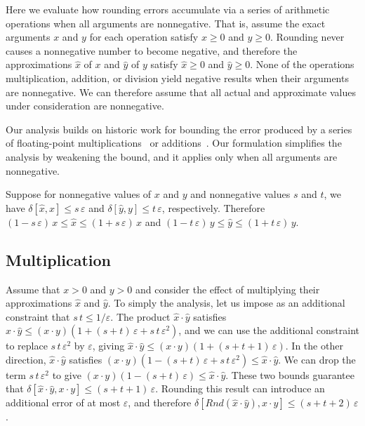 \documentclass[letterpaper,USenglish,cleveref, autoref, thm-restate]{lipics-v2021}
\newcommand{\approximate}[1]{\hat{#1}}
\newcommand{\approxx}{\approximate{x}}
\newcommand{\approxy}{\approximate{y}}
\newcommand{\round}{\mathit{Rnd}}
\newcommand{\aerror}{\delta}
\newcommand{\roundepsilon}{\varepsilon}
\begin{document}
Here we evaluate how rounding errors accumulate via a series of
arithmetic operations when all arguments are nonnegative.
That is, assume the exact arguments $x$ and $y$ for each operation satisfy $x \geq 0$ and $y \geq 0$.
Rounding never causes a nonnegative number to become negative, and therefore 
the approximations $\approxx$ of  $x$ and $\approxy$ of $y$ satisfy $\approxx \geq 0$ and $\approxy \geq 0$.
None of the operations multiplication, addition, or division yield negative results when their arguments are nonnegative.
We can therefore
assume that all actual and approximate values under consideration are
nonnegative.

Our analysis builds on historic work for bounding the error produced
by a series of floating-point
multiplications~\cite{muller:hfpa:2018,wilkinson:nm:1960,wilkinson:rounding:1963} or
additions~\cite{higham:siam:1993}.  Our formulation simplifies the analysis
by weakening the
bound, and it applies only when
all arguments are nonnegative.

Suppose for nonnegative values of $x$ and $y$ and nonnegative values $s$ and $t$, we have
$\aerror[\approxx, x] \leq s\, \roundepsilon$ and
$\aerror[\approxy, y] \leq t\, \roundepsilon$, respectively.
Therefore
$(1-s\,\roundepsilon)\, x \leq \approxx \leq (1+s\,\roundepsilon)\, x$ and
$(1-t\,\roundepsilon)\, y \leq \approxy \leq (1+t\,\roundepsilon)\, y$.


\subsection{Multiplication}

Assume that $x > 0$ and $y > 0$ and consider the effect of multiplying their approximations
$\approxx$ and $\approxy$.  To simply the analysis, let us impose as an additional constraint that $s\,t \leq 1/\roundepsilon$.
The product $\approxx \cdot \approxy$  satisfies
$\approxx \cdot \approxy \leq (x\cdot y) (1 + (s+t)\,\roundepsilon + s\,t\,\roundepsilon^2)$, and we can use the additional constraint to replace $s\,t\,\roundepsilon^2$ by $\roundepsilon$,
giving
$\approxx \cdot \approxy \leq (x\cdot y) (1 + (s+t+1)\,\roundepsilon)$.
In the other direction, $\approxx \cdot \approxy$ satisfies
$(x\cdot y) (1 - (s+t)\,\roundepsilon + s\,t\,\roundepsilon^2) \leq \approxx \cdot \approxy$.  We can drop the term
$s\,t\,\roundepsilon^2$ to give
$(x\cdot y) (1 - (s+t)\,\roundepsilon) \leq \approxx \cdot \approxy$.  These two bounds guarantee that
$\aerror[\approxx \cdot \approxy, x \cdot y] \leq (s+t+1)\,\roundepsilon$.
Rounding this result can introduce an additional error of at most $\roundepsilon$, and therefore
$\aerror[\round(\approxx \cdot \approxy), x \cdot y] \leq (s+t+2)\,\roundepsilon$.
\end{document}
